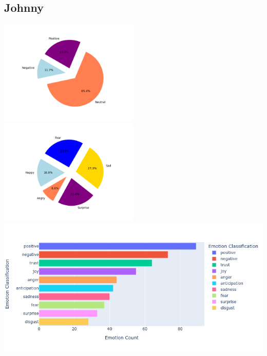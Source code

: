 \documentclass[a4paper,12pt]{article}
\begin{document}
	\subsection{Johnny}
	{\includegraphics[height=5cm]{johnnysVaderEmotionalPie.png}}
	{\includegraphics[height=5cm]{johnnysEmotionalPie.png}}\\
	{\includegraphics[width=17cm]{johnnyNrcImage.png}}\\
	\clearpage
\end{document}
